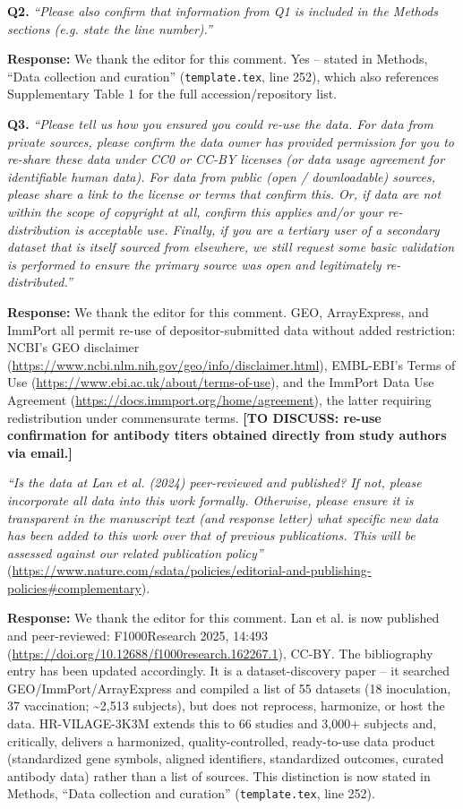 \documentclass[11pt]{article}
\newcommand{\origcomment}[1]{\textit{``#1''}}
\newcommand{\filledresponse}[1]{%
  \par\medskip\noindent\textbf{Response:} #1\par
  \vspace{0.4cm}%
  \par\noindent\hrulefill\par\bigskip
}
\begin{document}
\begin{commentlist}
\textbf{Q2.} \origcomment{Please also confirm that information from Q1 is included in the Methods
sections (e.g. state the line number).}
\filledresponse{We thank the editor for this comment. Yes -- stated in Methods, ``Data collection and curation'' (\texttt{template.tex},
line 252), which also references Supplementary Table 1 for the full accession/repository list.}

\textbf{Q3.} \origcomment{Please tell us how you ensured you could re-use the data. For data from
private sources, please confirm the data owner has provided permission for you to re-share these
data under CC0 or CC-BY licenses (or data usage agreement for identifiable human data). For data
from public (open / downloadable) sources, please share a link to the license or terms that
confirm this. Or, if data are not within the scope of copyright at all, confirm this applies
and/or your re-distribution is acceptable use. Finally, if you are a tertiary user of a secondary
dataset that is itself sourced from elsewhere, we still request some basic validation is
performed to ensure the primary source was open and legitimately re-distributed.}
\filledresponse{We thank the editor for this comment. GEO, ArrayExpress, and ImmPort all permit re-use of depositor-submitted data
without added restriction: NCBI's GEO disclaimer
(\url{https://www.ncbi.nlm.nih.gov/geo/info/disclaimer.html}), EMBL-EBI's Terms of Use
(\url{https://www.ebi.ac.uk/about/terms-of-use}), and the ImmPort Data Use Agreement
(\url{https://docs.immport.org/home/agreement}), the latter requiring redistribution under
commensurate terms. \textbf{[TO DISCUSS: re-use confirmation for antibody titers obtained directly
from study authors via email.]}}

\item[E7.] \origcomment{Is the data at Lan et al. (2024) peer-reviewed and published? If not,
please incorporate all data into this work formally. Otherwise, please ensure it is transparent
in the manuscript text (and response letter) what specific new data has been added to this work
over that of previous publications. This will be assessed against our related publication policy}
(\url{https://www.nature.com/sdata/policies/editorial-and-publishing-policies#complementary}).
\filledresponse{We thank the editor for this comment. Lan et al. is now published and peer-reviewed: F1000Research 2025, 14:493
(\url{https://doi.org/10.12688/f1000research.162267.1}), CC-BY. The bibliography entry has been
updated accordingly. It is a dataset-discovery paper -- it searched GEO/ImmPort/ArrayExpress and
compiled a list of 55 datasets (18 inoculation, 37 vaccination; \textasciitilde2,513 subjects), but
does not reprocess, harmonize, or host the data. HR-VILAGE-3K3M extends this to 66 studies and
3,000+ subjects and, critically, delivers a harmonized, quality-controlled, ready-to-use data
product (standardized gene symbols, aligned identifiers, standardized outcomes, curated antibody
data) rather than a list of sources. This distinction is now stated in Methods, ``Data collection
and curation'' (\texttt{template.tex}, line 252).}


\end{commentlist}
\end{document}
